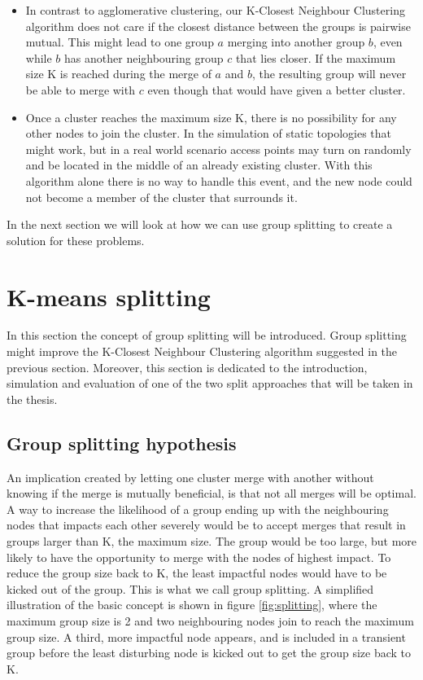 \begin{itemize}
	\item In contrast to agglomerative clustering, our K-Closest Neighbour Clustering algorithm does not care if the closest distance between the groups is pairwise mutual. This
		might lead to one group $a$ merging into another group $b$, even while $b$ has another neighbouring group $c$ that lies closer. If the maximum size K is reached during the merge of
		$a$ and $b$,  the resulting group will never be able to merge with $c$ even though that would have given a better cluster. 
	\item Once a cluster reaches the maximum size K, there is no possibility for any other nodes to join the cluster.
		In the simulation of static topologies that might work, but in a real world scenario access points may turn on randomly and be located in the middle of an already existing cluster.
		With this algorithm alone there is no way to handle this event, and the new node could not become a member of the cluster that surrounds it. 
\end{itemize}
In the next section we will look at how we can use group splitting to create a solution for these problems. 

\section{K-means splitting}
In this section the concept of group splitting will be introduced. Group splitting might improve the K-Closest Neighbour Clustering algorithm suggested in the previous section.
Moreover, this section is dedicated to the introduction, simulation and evaluation of one of the two split approaches that will be taken in the thesis.

\subsection{Group splitting hypothesis}
An implication created by letting one cluster merge with another without knowing if the merge is mutually beneficial, is that not all merges will be optimal.
A way to increase the likelihood of a group ending up with the neighbouring nodes that impacts each other severely would be to accept merges that result in groups larger than K, the maximum size. 
The group would be too large, but more likely to have the opportunity to merge with the nodes of highest impact. To reduce the group size back to K,
the least impactful nodes would have to be kicked out of the group. This is what we call group splitting. A simplified illustration of the basic concept is shown in figure \ref{fig:splitting},
where the maximum group size is 2 and two neighbouring nodes join to reach the maximum group size. A third, more impactful node appears, and is included in a transient group
before the least disturbing node is kicked out to get the group size back to K. 

